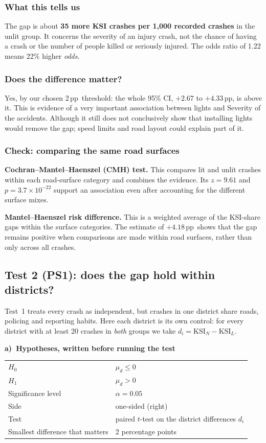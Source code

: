 \documentclass[10pt,a4paper,twocolumn]{article}
\newcommand{\tpart}[2]{\par\Needspace{12\baselineskip}\smallskip\textbf{#1)~#2}\par}
\newcommand{\pp}{\,pp}
\begin{document}
\subsubsection*{What this tells us}
The gap is about \textbf{35 more KSI crashes per 1{,}000 recorded crashes} in the unlit group.
It concerns the severity of an injury crash, not the chance of having a crash or the number
of people killed or seriously injured. The odds ratio of 1.22 means 22\% higher \emph{odds}.

\subsubsection*{Does the difference matter?}
Yes, by our chosen 2\pp\ threshold: the whole 95\% CI, $+2.67$ to $+4.33$\pp, is above it.
This is evidence of a very important association between lights and Severity of the accidents.
Although it still does not conclusively show that installing lights would remove the gap; speed limits and road layout
could explain part of it.

\subsubsection*{Check: comparing the same road surfaces}
\textbf{Cochran--Mantel--Haenszel (CMH) test.} This compares lit and unlit crashes within each
road-surface category and combines the evidence. Its $z=9.61$ and $p=3.7\times10^{-22}$
support an association even after accounting for the different surface mixes.

\textbf{Mantel--Haenszel risk difference.} This is a weighted average of the KSI-share gaps
within the surface categories. The estimate of $+4.18$\pp\ shows that the gap remains positive
when comparisons are made within road surfaces, rather than only across all crashes.

\subsection*{Test 2 (PS1): does the gap hold within districts?}

Test~1 treats every crash as independent, but crashes in one district share roads, policing and
reporting habits. Here each district is its own control: for every district with at least 20
crashes in \emph{both} groups we take $d_i=\text{KSI}_N-\text{KSI}_L$.

\tpart{a}{Hypotheses, written before running the test}
{\small
\begin{tabularx}{\linewidth}{@{}K{3.4cm} Y@{}}
\toprule
$H_0$ & $\mu_d\le0$ \\
$H_1$ & $\mu_d>0$ \\
Significance level & $\alpha=0.05$ \\
Side & one-sided (right) \\
Test & paired $t$-test on the district differences $d_i$ \\
Smallest difference that matters & 2 percentage points \\
\bottomrule
\end{tabularx}}
\end{document}
